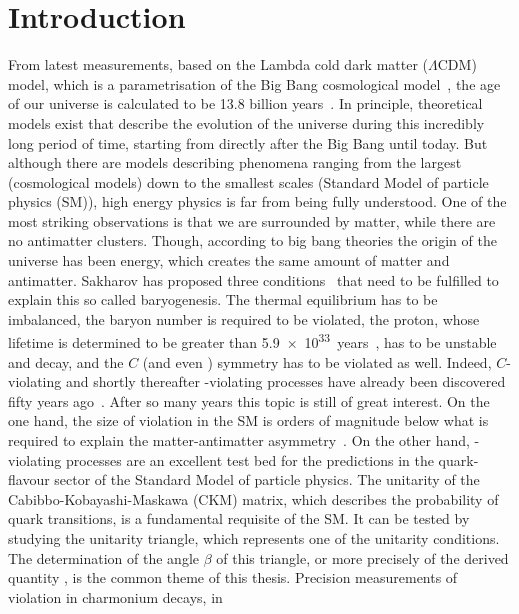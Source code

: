 
\chapter{Introduction}
\label{sec:Introduction}

From latest measurements, based on the Lambda cold dark matter ($\Lambda$CDM)
model, which is a parametrisation of the Big Bang cosmological
model~\cite{BigBang}, the age of our universe is calculated to be \num{13.8}
billion years~\cite{Ade:2015xua}. In principle, theoretical models exist that
describe the evolution of the universe during this incredibly long period of
time, starting from directly after the Big Bang until today. But although
there are models describing phenomena ranging from the largest (cosmological
models) down to the smallest scales (Standard Model of particle physics (SM)),
high energy physics is far from being fully understood. One of the most
striking observations is that we are surrounded by matter, while there are no
antimatter clusters. Though, according to big bang theories the origin of the
universe has been energy, which creates the same amount of matter and
antimatter. Sakharov has proposed three conditions~\cite{Sakharov:1967dj}
that need to be fulfilled to explain this so called baryogenesis. The thermal
equilibrium has to be imbalanced, the baryon number is required to be
violated, \ie the proton, whose lifetime is determined to be greater than
\SI{5.9e33}{years}~\cite{Abe:2014mwa}, has to be unstable and decay, and the
$C$ (and even \CP) symmetry has to be violated as well. Indeed, $C$-violating
and shortly thereafter \CP-violating processes have already been discovered
fifty years ago~\cite{CPV_discovery}. After so many years this topic is still
of great interest. On the one hand, the size of \CP violation in the SM is
orders of magnitude below what is required to explain the matter-antimatter
asymmetry~\cite{Huet:1994jb}. On the other hand, \CP-violating processes are
an excellent test bed for the predictions in the quark-flavour sector of the
Standard Model of particle physics. The unitarity of the
Cabibbo-Kobayashi-Maskawa (CKM) matrix, which describes the probability of
quark transitions, is a fundamental requisite of the SM. It can be tested by
studying the unitarity triangle, which represents one of the unitarity
conditions. The determination of the angle $\beta$ of this triangle, or more
precisely of the derived quantity \sintwobeta, is the common theme of this
thesis. Precision measurements of \CP violation in charmonium decays, \ie in
